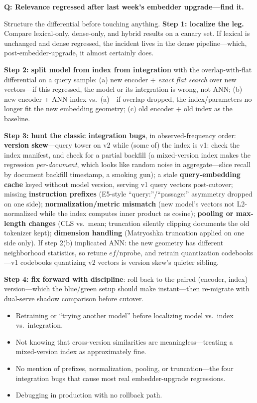 \begin{interviewq}
\textbf{Q: Relevance regressed after last week's embedder upgrade---find it.}

 \quad {} \quad \badgefreq{\freqhigh}

\stronganswer

Structure the differential before touching anything. \textbf{Step 1: localize the leg.} Compare lexical-only, dense-only, and hybrid results on a canary set. If lexical is unchanged and dense regressed, the incident lives in the dense pipeline---which, post-embedder-upgrade, it almost certainly does.

\textbf{Step 2: split model from index from integration} with the overlap-with-flat differential on a query sample: (a) new encoder + \textit{exact flat search} over new vectors---if this regressed, the model or its integration is wrong, not ANN; (b) new encoder + ANN index vs.\ (a)---if overlap dropped, the index/parameters no longer fit the new embedding geometry; (c) old encoder + old index as the baseline.

\textbf{Step 3: hunt the classic integration bugs}, in observed-frequency order: \textbf{version skew}---query tower on v2 while (some of) the index is v1: check the index manifest, and check for a partial backfill (a mixed-version index makes the regression \textit{per-document}, which looks like random noise in aggregate---slice recall by document backfill timestamp, a smoking gun); a stale \textbf{query-embedding cache} keyed without model version, serving v1 query vectors post-cutover; missing \textbf{instruction prefixes} (E5-style ``query:''/``passage:'' asymmetry dropped on one side); \textbf{normalization/metric mismatch} (new model's vectors not L2-normalized while the index computes inner product as cosine); \textbf{pooling or max-length changes} (CLS vs.\ mean; truncation silently clipping documents the old tokenizer kept); \textbf{dimension handling} (Matryoshka truncation applied on one side only). If step 2(b) implicated ANN: the new geometry has different neighborhood statistics, so retune $ef$/nprobe, and retrain quantization codebooks---v1 codebooks quantizing v2 vectors is version skew's quieter sibling.

\textbf{Step 4: fix forward with discipline}: roll back to the paired (encoder, index) version---which the blue/green setup should make instant---then re-migrate with dual-serve shadow comparison before cutover.

\redflags
\begin{itemize}
    \item Retraining or ``trying another model'' before localizing model vs.\ index vs.\ integration.
    \item Not knowing that cross-version similarities are meaningless---treating a mixed-version index as approximately fine.
    \item No mention of prefixes, normalization, pooling, or truncation---the four integration bugs that cause most real embedder-upgrade regressions.
    \item Debugging in production with no rollback path.
\end{itemize}


\end{interviewq}
